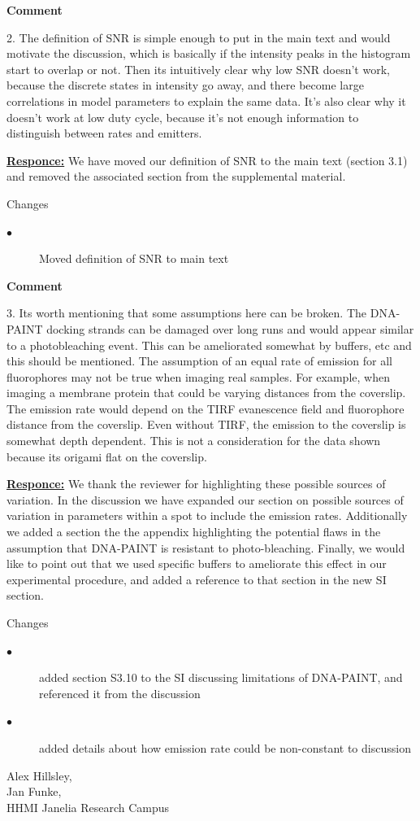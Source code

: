 \documentclass{article}
\begin{document}
\textbf{Comment}

2. The definition of SNR is simple enough to put in the main text and would motivate the discussion, 
which is basically if the intensity peaks in the histogram start to overlap or not. 
Then its intuitively clear why low SNR doesn’t work, because the discrete states in 
intensity go away, and there become large correlations in model parameters to explain the same data. 
It’s also clear why it doesn’t work at low duty cycle, because it’s not enough information to 
distinguish between rates and emitters.

\underline{\textbf{Responce:}}
We have moved our definition of SNR to the main text (section 3.1) and removed the associated section from the 
supplemental material.

Changes
\begin{description}
    \item[$\bullet$] Moved definition of SNR to main text
\end{description}

\textbf{Comment}

3. Its worth mentioning  that some assumptions here can be broken. 
The DNA-PAINT docking strands can be damaged over long runs and would appear 
similar to a photobleaching event. 
This can be ameliorated somewhat by buffers, etc and this should be mentioned. 
The assumption of an equal rate of emission for all fluorophores may not be true when imaging real samples. 
For example, when imaging a membrane protein that could be varying distances from the coverslip. 
The emission rate would depend on the TIRF evanescence field and fluorophore distance from the coverslip. 
Even without TIRF, the emission to the coverslip is somewhat depth dependent. 
This is not a consideration for the data shown because its origami flat on the coverslip.

\underline{\textbf{Responce:}}
We thank the reviewer for highlighting these possible sources of variation. In the discussion we have expanded our 
section on possible sources of variation in parameters within a spot to include the emission rates. Additionally 
we added a section the the appendix highlighting the potential flaws in the assumption that DNA-PAINT is resistant 
to photo-bleaching. Finally, we would like to point out that we used specific buffers to ameliorate this effect in 
our experimental procedure, and added a reference to that section in the new SI section. 

Changes
\begin{description}
    \item[$\bullet$] added section S3.10 to the SI discussing limitations of DNA-PAINT, and referenced 
    it from the discussion
    \item[$\bullet$] added details about how emission rate could be non-constant to discussion
\end{description}

% 
% 

\vspace{5mm}
Alex Hillsley,\\
Jan Funke,\\
HHMI Janelia Research Campus
\end{document}
